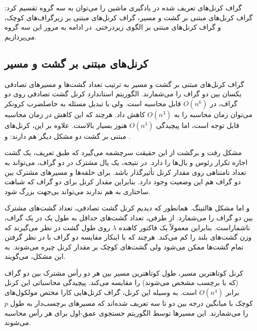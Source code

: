 گراف کرنل‌های تعریف شده در یادگیری ماشین را می‌توان به سه گروه تقسیم کرد: گراف کرنل‌های مبتنی بر گشت و مسیر، گراف کرنل‌های مبتنی بر زیرگراف‌های کوچک، و گراف کرنل‌های مبتنی بر الگوی زیردرختی. در ادامه به مرور این سه گروه می‌پردازیم.

\subsection{کرنل‌های مبتنی بر گشت و مسیر}
گراف کرنل‌های مبتنی بر گشت و مسیر به ترتیب تعداد گشت‌ها و مسیرهای تصادفی یکسان بین دو گراف را می‌شمارند. الگوریتم استاندارد کرنل گشت تصادفی روی دو گراف، در $O(n^6)$  قابل محاسبه است. ولی با تبدیل مسئله به حاصلضرب کرونکر می‌توان زمان محاسبه را به $O(n^3)$ کاهش داد. هرچند که این کاهش در زمان محاسبه قابل توجه است، اما پیچیدگی $O(n^3)$ هنوز بسیار بالاست. علاوه بر این، کرنل‌های مبتنی بر گشت دو مشکل دیگر هم دارند:  و .

مشکل رفت و برگشت از این حقیقت سرچشمه می‌گیرد که طبق تعریف، یک گشت اجازه تکرار رئوس و یال‌ها را دارد. در نتیجه، یک یال مشترک در دو گراف، می‌تواند به تعداد نامتناهی روی مقدار کرنل تأثیرگذار باشد. برای حلقه‌ها و مسیرهای مشترک بین دو گراف هم این وضعیت وجود دارد. بنابراین مقدار کرنل برای دو گراف که شباهت ساختاری به هم ندارند می‌تواند بی‌جهت بزرگ شود.

و اما مشکل هالتینگ. همانطور که دیدیم کرنل گشت تصادفی، تعداد  گشت‌های مشترک بین دو گراف را می‌شمارد. از طرفی، تعداد گشت‌های حداقل به طول یک در یک گراف، ناشماراست. بنابراین معمولاً یک فاکتور کاهنده $\lambda$ روی طول گشت در نظر می‌گیرند که وزن گشت‌های بلند را کم می‌کند. هرچند که با اینکار مقایسه دو گراف با در نظر گرفتن تمام گشت‌ها ممکن می‌شود ولی گشت‌های کوچک بر مقدار کرنل چیره می‌شوند. به این مشکل،  می‌گویند.

کرنل کوتاهترین مسیر، طول کوتاهترین مسیر بین هر دو رأس مشترک بین دو گراف (که با برچسب مشخص می‌شوند) را مقایسه می‌کند. پیچیدگی محاسباتی این کرنل برابر $O(n^4)$ است. به وسیله این کرنل، گراف کرنل‌هایی کارا مختص مولکول‌های کوچک با میانگین درجه بین دو تا سه تعریف شده‌اند که مسیرهای برچسب‌دار به طول $p$ را می‌شمارند. این مسیر‌ها توسط الگوریتم جستجوی عمق-اول برای هر رأس محاسبه می‌شوند.

